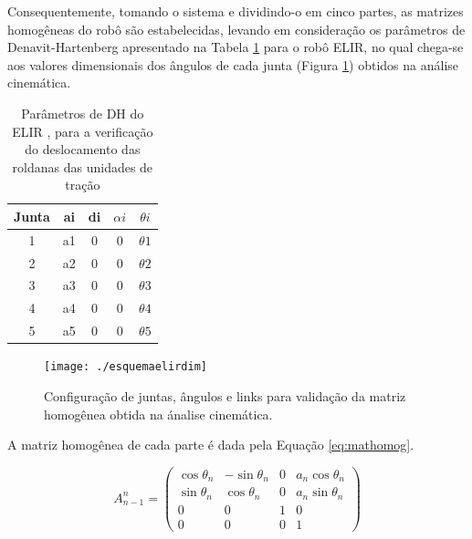 Consequentemente, tomando o sistema e dividindo-o em cinco partes, as matrizes homogêneas do robô são estabelecidas, levando em consideração os parâmetros de Denavit-Hartenberg apresentado na Tabela \ref{tab:parametrodhelir} para o robô ELIR, no qual chega-se aos valores dimensionais dos ângulos de cada junta (Figura \ref{img:esquemaelirdim}) obtidos na análise cinemática.

\begin{table}[htb!]
	\caption{Parâmetros de DH do ELIR , para a verificação do deslocamento das roldanas das unidades de tração}
	\label{tab:parametrodhelir}
	\centering
	\begin{tabular}{c|c|c|c|c}
		Junta    & ai & di & $\alpha i$ & $\theta  i$ \\ \hline
		1        & a1 & 0  & 0        & $\theta 1$  \\
		2        & a2 & 0  & 0        & $\theta 2$  \\
		3        & a3 & 0  & 0        & $\theta 3$  \\
		4        & a4 & 0  & 0        & $\theta 4$  \\
		5        & a5 & 0  & 0        & $\theta 5$  \\ \hline
	\end{tabular}
\end{table}

\begin{figure} [h!]	
	\caption{Configuração de juntas, ângulos e links para validação da matriz homogênea obtida na ánalise cinemática.}
	\label{img:esquemaelirdim}											 
	\centering													 
	\texttt{[image: ./esquemaelirdim]}
\end{figure}													 

A matriz homogênea de cada parte é dada pela Equação \ref{eq:mathomog}. 

\begin{equation}
\label{eq:mathomog}
	{A}_{n-1}^{n}=\left (
	\begin{matrix}
 		\cos{\theta}_{n} & -\sin{\theta}_{n} & 0 & {a}_{n}\cos{\theta}_{n} \\ 
 		\sin{\theta}_{n} & \cos{\theta}_{n} & 0 & {a}_{n}\sin{\theta}_{n} \\ 
		0 & 0 & 1 & 0 \\
		0 & 0 & 0 & 1
	\end{matrix}
\right )
\end{equation}

